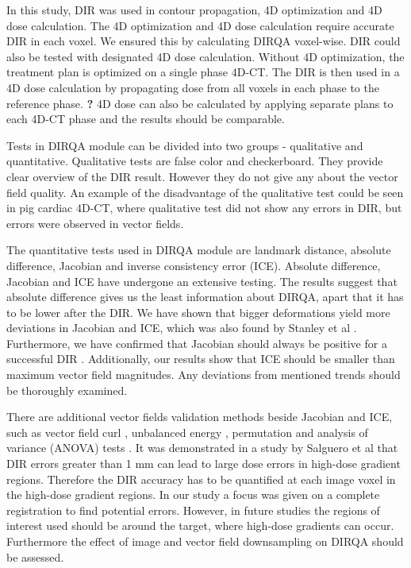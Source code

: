 \documentclass[type=dr, dr=rernat, accentcolor=tud7b,colorbacktitle, bigchapter, openright, twoside, 12pt ]{tudthesis}
\begin{document}
In this study, DIR was used in contour propagation, 4D optimization and 4D dose calculation. The 4D optimization and 4D dose calculation require 
accurate DIR in each voxel. We ensured this by calculating DIRQA voxel-wise. DIR could also be tested with designated 4D dose calculation. Without 4D optimization, 
the treatment plan is optimized on a single phase 4D-CT. The DIR is then used in a 4D dose calculation by propagating dose from all voxels in each phase to the reference phase.
\textbf{?} 4D dose can also be calculated by applying separate plans to each 4D-CT phase and the results should be comparable.

Tests in DIRQA module can be divided into two groups - qualitative and quantitative. Qualitative tests are false color and checkerboard. They provide clear overview of the DIR result.
However they do not give any about the vector field quality. An example of the disadvantage of the qualitative test could be seen in pig cardiac 4D-CT, where qualitative test did not show
any errors in DIR, but errors were observed in vector fields. 

The quantitative tests used in DIRQA module are landmark distance, absolute difference, Jacobian and inverse consistency error (ICE). Absolute difference, Jacobian and ICE have undergone an extensive testing. The results suggest
that absolute difference gives us the least information about DIRQA, apart that it has to be lower after the DIR. 
We have shown that bigger deformations yield more deviations in Jacobian and ICE, which was also found by Stanley et al \cite{Stanley2013}. 
Furthermore, we have confirmed that Jacobian should always be positive for a successful DIR \cite{Rey2002}. Additionally, our results show that ICE should 
be smaller than maximum vector field magnitudes. Any deviations from mentioned trends should be thoroughly examined.

There are additional vector fields validation methods beside Jacobian and ICE, such as vector field curl \cite{Schreibmann2012}, unbalanced energy \cite{Zhong2007}, 
permutation and analysis of variance (ANOVA) tests \cite{Klein2009}.
It was demonstrated in a study by Salguero et al \cite{Salguero2011} that DIR errors greater than 1 mm can lead to large dose errors in high-dose gradient regions. 
Therefore the DIR accuracy has to be quantified at each image voxel in the high-dose 
gradient regions. In our study a focus was given on a complete registration to find potential errors. However, in future studies the regions of interest used
should be around the target, where high-dose gradients can occur. Furthermore the effect of image and vector field downsampling on DIRQA should be assessed.
\end{document}
